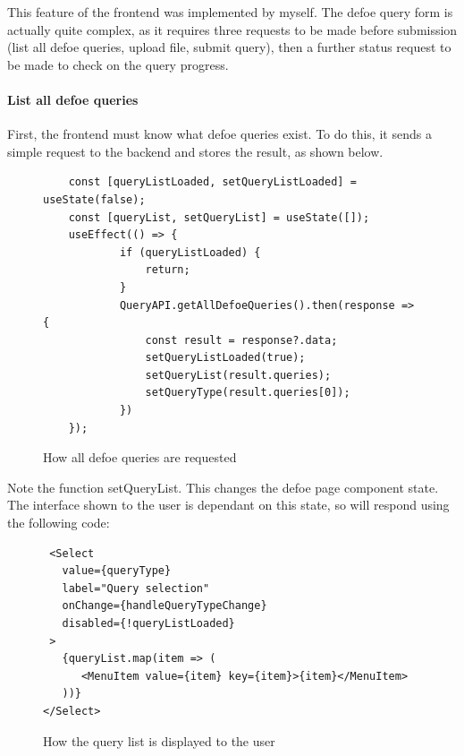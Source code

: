 \documentclass[12pt, letterpaper]{article}
\begin{document}
\begin{flushleft}
This feature of the frontend was implemented by myself. The defoe query form is actually quite complex, as it requires three requests to be made before submission (list all defoe queries, upload file, submit query), then a further status request to be made to check on the query progress.
\end{flushleft}

\paragraph{List all defoe queries}

\begin{flushleft}
First, the frontend must know what defoe queries exist. To do this, it sends a simple request to the backend and stores the result, as shown below.
\end{flushleft}

\begin{flushleft}
\begin{figure}[H]
\begin{verbatim}
    const [queryListLoaded, setQueryListLoaded] = useState(false);
    const [queryList, setQueryList] = useState([]);
    useEffect(() => {
            if (queryListLoaded) {
                return;
            }
            QueryAPI.getAllDefoeQueries().then(response => {
                const result = response?.data;
                setQueryListLoaded(true);
                setQueryList(result.queries);
                setQueryType(result.queries[0]);
            })
    });
\end{verbatim}
\caption{How all defoe queries are requested}
\end{figure}
\end{flushleft}

\begin{flushleft}
Note the function setQueryList. This changes the defoe page component state. The interface shown to the user is dependant on this state, so will respond using the following code:
\end{flushleft}

\begin{flushleft}
\begin{figure}[H]
\begin{verbatim}
 <Select
   value={queryType}
   label="Query selection"
   onChange={handleQueryTypeChange}
   disabled={!queryListLoaded}
 >
   {queryList.map(item => (
      <MenuItem value={item} key={item}>{item}</MenuItem>
   ))}
</Select>
\end{verbatim}
\caption{How the query list is displayed to the user}
\end{figure}
\end{flushleft}
\end{document}
